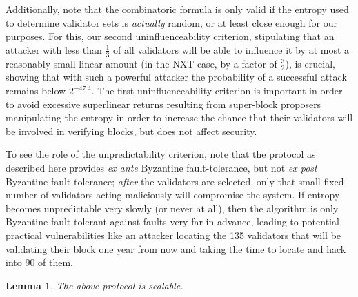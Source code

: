 \documentclass[11pt,a4paper]{report}
\theoremstyle{plain}
\newtheorem{lem}[thm]{Lemma}
\theoremstyle{definition}
\theoremstyle{remark}
\begin{document}
Additionally, note that the combinatoric formula is only valid if the entropy used to determine validator sets is \emph{actually} random, or at least close enough for our purposes. For this, our second uninfluenceability criterion, stipulating that an attacker with less than $\frac{1}{3}$ of all validators will be able to influence it by at most a reasonably small linear amount (in the NXT case, by a factor of $\frac{3}{2}$), is crucial, showing that with such a powerful attacker the probability of a successful attack remains below $2^{-47.4}$. The first uninfluenceability criterion is important in order to avoid excessive superlinear returns resulting from super-block proposers manipulating the entropy in order to increase the chance that their validators will be involved in verifying blocks, but does not affect security.

To see the role of the unpredictability criterion, note that the protocol as described here provides \emph{ex ante} Byzantine fault-tolerance, but not \emph{ex post} Byzantine fault tolerance; \emph{after} the validators are selected, only that small fixed number of validators acting maliciously will compromise the system. If entropy becomes unpredictable very slowly (or never at all), then the algorithm is only Byzantine fault-tolerant against faults very far in advance, leading to potential practical vulnerabilities like an attacker locating the 135 validators that will be validating their block one year from now and taking the time to locate and hack into 90 of them.

\begin{lem}
The above protocol is scalable.
\end{lem}
\end{document}
